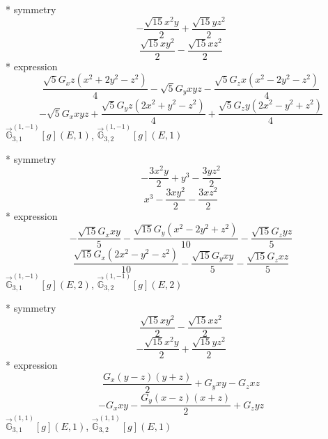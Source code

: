 \documentclass[fleqn,8pt]{jsarticle}
\begin{document}
\noindent\quad ** symmetry
\begin{dmath*}
- \frac{\sqrt{15} x^{2} y}{2} + \frac{\sqrt{15} y z^{2}}{2}
\end{dmath*}
\begin{dmath*}
\frac{\sqrt{15} x y^{2}}{2} - \frac{\sqrt{15} x z^{2}}{2}
\end{dmath*}
\noindent\quad ** expression
\begin{dmath*}
\frac{\sqrt{5} G_{x} z \left(x^{2} + 2 y^{2} - z^{2}\right)}{4} - \sqrt{5} G_{y} x y z - \frac{\sqrt{5} G_{z} x \left(x^{2} - 2 y^{2} - z^{2}\right)}{4}
\end{dmath*}
\begin{dmath*}
- \sqrt{5} G_{x} x y z + \frac{\sqrt{5} G_{y} z \left(2 x^{2} + y^{2} - z^{2}\right)}{4} + \frac{\sqrt{5} G_{z} y \left(2 x^{2} - y^{2} + z^{2}\right)}{4}
\end{dmath*}
\noindent\quad $\vec{\mathbb{G}}_{3,1}^{(1,-1)}[g](E,1)$, $\vec{\mathbb{G}}_{3,2}^{(1,-1)}[g](E,1)$

\noindent\quad ** symmetry
\begin{dmath*}
- \frac{3 x^{2} y}{2} + y^{3} - \frac{3 y z^{2}}{2}
\end{dmath*}
\begin{dmath*}
x^{3} - \frac{3 x y^{2}}{2} - \frac{3 x z^{2}}{2}
\end{dmath*}
\noindent\quad ** expression
\begin{dmath*}
- \frac{\sqrt{15} G_{x} x y}{5} - \frac{\sqrt{15} G_{y} \left(x^{2} - 2 y^{2} + z^{2}\right)}{10} - \frac{\sqrt{15} G_{z} y z}{5}
\end{dmath*}
\begin{dmath*}
\frac{\sqrt{15} G_{x} \left(2 x^{2} - y^{2} - z^{2}\right)}{10} - \frac{\sqrt{15} G_{y} x y}{5} - \frac{\sqrt{15} G_{z} x z}{5}
\end{dmath*}
\noindent\quad $\vec{\mathbb{G}}_{3,1}^{(1,-1)}[g](E,2)$, $\vec{\mathbb{G}}_{3,2}^{(1,-1)}[g](E,2)$

\noindent\quad ** symmetry
\begin{dmath*}
\frac{\sqrt{15} x y^{2}}{2} - \frac{\sqrt{15} x z^{2}}{2}
\end{dmath*}
\begin{dmath*}
- \frac{\sqrt{15} x^{2} y}{2} + \frac{\sqrt{15} y z^{2}}{2}
\end{dmath*}
\noindent\quad ** expression
\begin{dmath*}
\frac{G_{x} \left(y - z\right) \left(y + z\right)}{2} + G_{y} x y - G_{z} x z
\end{dmath*}
\begin{dmath*}
- G_{x} x y - \frac{G_{y} \left(x - z\right) \left(x + z\right)}{2} + G_{z} y z
\end{dmath*}
\noindent\quad $\vec{\mathbb{G}}_{3,1}^{(1,1)}[g](E,1)$, $\vec{\mathbb{G}}_{3,2}^{(1,1)}[g](E,1)$
\end{document}

